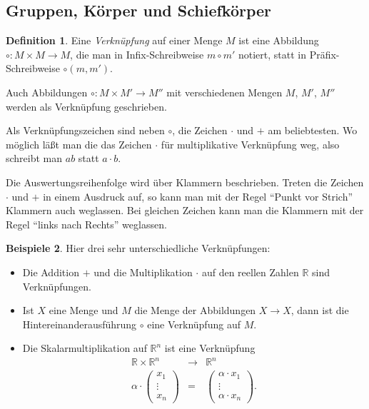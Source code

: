 \documentclass[index=totoc]{scrartcl}%
\theoremstyle{definition}
\newtheorem{defi}{Definition}[section]
\newtheorem{bspe}[defi]{Beispiele}
\newcommand{\R}{\mathbb R}
\begin{document}
\subsection{Gruppen, Körper und Schiefkörper}
\label{sec:grpField}

\begin{defi}
  Eine {\em Verknüpfung} auf einer Menge $M$
  ist eine Abbildung  $\circ\colon M\times M\to M$,
  die man in Infix-Schreibweise $m\circ m'$ notiert,
  statt in Präfix-Schreibweise $\circ(m, m')$.

  Auch Abbildungen $\circ\colon M\times M'\to M''$
  mit verschiedenen Mengen $M$, $M'$, $M''$ werden als Verknüpfung geschrieben.

  Als Verknüpfungszeichen sind neben $\circ$,
  die Zeichen $\cdot$ und $+$ am beliebtesten. 
  Wo möglich läßt man die das Zeichen $\cdot$
  für multiplikative Verknüpfung weg,
  also schreibt man $ab$ statt $a\cdot b$.

  Die Auswertungsreihenfolge wird über Klammern beschrieben.
  Treten die Zeichen $\cdot$ und $+$ in einem Ausdruck auf,
  so kann man mit der Regel "`Punkt vor Strich"' Klammern auch weglassen.
  Bei gleichen Zeichen
  kann man die Klammern mit der Regel "`links nach Rechts"' weglassen. 
\end{defi}

\begin{bspe}
  Hier drei sehr unterschiedliche Verknüpfungen:
  \begin{itemize}
  \item
  Die Addition $+$ und die Multiplikation $\cdot$ auf den reellen Zahlen $\R$
  sind Verknüpfungen.
  \item
  Ist $X$ eine Menge und $M$ die Menge der Abbildungen $X\to X$,
  dann ist die Hintereinanderausführung $\circ$ eine Verknüpfung auf $M$.
  \item
    Die Skalarmultiplikation auf $\R^n$ ist eine Verknüpfung
    \begin{eqnarray*}
      \R\times\R^n&\to&\R^n \\
      \alpha\cdot
      \left(\begin{array}{c}x_1\\\vdots\\x_n\end{array}\right)
                  &=&
      \left(
      \begin{array}{c}\alpha\cdot x_1\\\vdots\\\alpha\cdot x_n\end{array}
      \right).
    \end{eqnarray*}
  \end{itemize}
\end{bspe}
\end{document}
